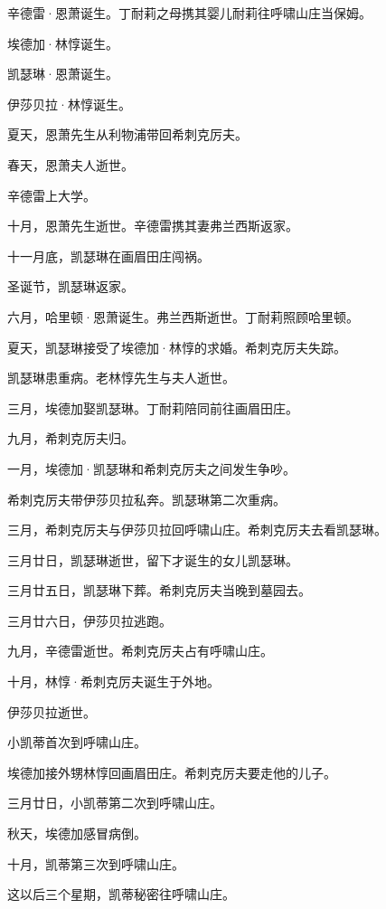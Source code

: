 \par {} 辛德雷·恩萧诞生。丁耐莉之母携其婴儿耐莉往呼啸山庄当保姆。
\par {} 埃德加·林惇诞生。
\par {} 凯瑟琳·恩萧诞生。
\par {} 伊莎贝拉·林惇诞生。
\par {} 夏天，恩萧先生从利物浦带回希刺克厉夫。
\par {} 春天，恩萧夫人逝世。
\par {} 辛德雷上大学。
\par {} 十月，恩萧先生逝世。辛德雷携其妻弗兰西斯返家。
\par 十一月底，凯瑟琳在画眉田庄闯祸。
\par 圣诞节，凯瑟琳返家。
\par {} 六月，哈里顿·恩萧诞生。弗兰西斯逝世。丁耐莉照顾哈里顿。
\par {} 夏天，凯瑟琳接受了埃德加·林惇的求婚。希刺克厉夫失踪。
\par 凯瑟琳患重病。老林惇先生与夫人逝世。
\par {} 三月，埃德加娶凯瑟琳。丁耐莉陪同前往画眉田庄。
\par 九月，希刺克厉夫归。
\par {} 一月，埃德加·凯瑟琳和希刺克厉夫之间发生争吵。
\par 希刺克厉夫带伊莎贝拉私奔。凯瑟琳第二次重病。
\par 三月，希刺克厉夫与伊莎贝拉回呼啸山庄。希刺克厉夫去看凯瑟琳。
\par 三月廿日，凯瑟琳逝世，留下才诞生的女儿凯瑟琳。
\par 三月廿五日，凯瑟琳下葬。希刺克厉夫当晚到墓园去。
\par 三月廿六日，伊莎贝拉逃跑。
\par 九月，辛德雷逝世。希刺克厉夫占有呼啸山庄。
\par 十月，林惇·希刺克厉夫诞生于外地。
\par {} 伊莎贝拉逝世。
\par 小凯蒂首次到呼啸山庄。
\par 埃德加接外甥林惇回画眉田庄。希刺克厉夫要走他的儿子。
\par {} 三月廿日，小凯蒂第二次到呼啸山庄。
\par 秋天，埃德加感冒病倒。
\par 十月，凯蒂第三次到呼啸山庄。
\par 这以后三个星期，凯蒂秘密往呼啸山庄。
